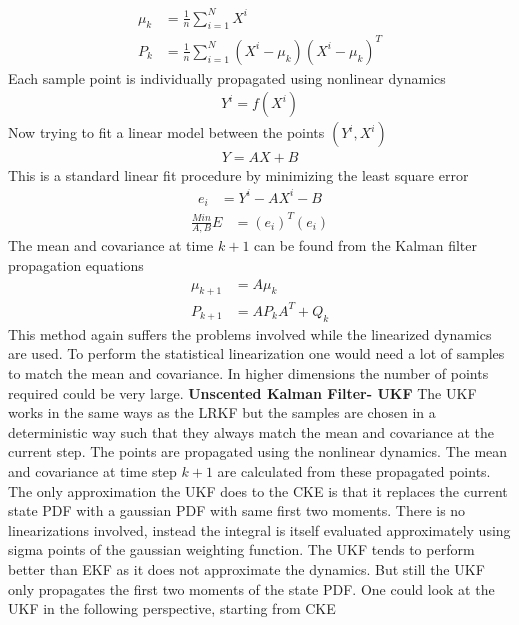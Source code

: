\documentclass{article}
\begin{document}
\begin{align}
\mu_k&=\frac{1}{n}\sum_{i=1}^{N}X^i\\
P_k&=\frac{1}{n}\sum_{i=1}^{N}(X^i-\mu_k)(X^i-\mu_k)^T
\end{align}
Each sample point is individually propagated using nonlinear dynamics
\begin{align}
Y^i=f(X^i)
\end{align} 	 
Now trying to fit a linear model between the points $(Y^i,X^i)$
\begin{align}
Y=AX+B
\end{align}
This is a standard linear fit procedure by minimizing the least square error
\begin{align}
e_i&=Y^i-AX^i-B
\end{align}
\begin{align}
\frac{Min}{A,B} E&=(e_i)^T(e_i)
\end{align}
The mean and covariance at time $k+1$ can be found from the Kalman filter propagation equations
	\begin{align}
\mu_{k+1}&=A\mu_k\\
P_{k+1}&=AP_kA^T+Q_k
\end{align}
This method again suffers the problems involved while the linearized dynamics are used. To perform the statistical linearization one would need a lot of samples to match the mean and covariance. In higher dimensions the number of points required could be very large.\newline\newline
 {\bf Unscented Kalman Filter- UKF}\newline\newline
 The UKF works in the same ways as the LRKF but the samples are chosen in a deterministic way such that they always match the mean and covariance at the current step. The points are propagated using the nonlinear dynamics. The mean and covariance at time step $k+1$ are calculated from these propagated points. The only approximation the UKF does to the CKE is that it replaces the current state PDF with a gaussian PDF with same first two moments. There is no linearizations involved, instead the integral is itself evaluated approximately using sigma points of the gaussian weighting function. The UKF tends to perform better than EKF as it does not approximate the dynamics. But still the UKF only propagates the first two moments of the state PDF. One could look at the UKF in the following perspective, starting from CKE
\end{document}
